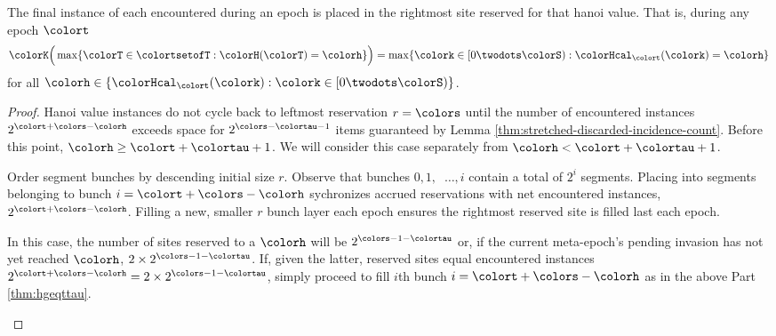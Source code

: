 \begin{lemma}
\label{thm:tilted-last-touched}
The final instance of each \hv{} encountered during an epoch is placed in the rightmost site reserved for that hanoi value.
That is, during any epoch $\colort$
\begin{align*}
\colorK\Big(
  \max\{\colorT \in \colortsetofT : \colorH(\colorT) = \colorh\}
\Big)
=
\max\{\colork \in [0\twodots\colorS) : \colorHcal_{\colort}(\colork) = \colorh \}
\end{align*}
for all $\colorh \in \{\colorHcal_{\colort}(\colork) : \colork \in [0\twodots\colorS)\}$.
\end{lemma}

\begin{proof}
Hanoi value instances do not cycle back to leftmost reservation $r=\colors$ until the number of encountered \hv{} instances $2^{\colort + \colors - \colorh}$ exceeds space for $2^{\colors - \colortau - 1}$ items guaranteed by Lemma \ref{thm:stretched-discarded-incidence-count}.
Before this point, $\colorh \geq \colort + \colortau + 1$.
We will consider this case separately from $\colorh < \colort + \colortau + 1$.

\begin{proofpart}
\label{thm:hgeqttau}
Order segment bunches by descending initial size $r$.
Observe that bunches $0,1,\;\;\ldots,i$ contain a total of $2^i$ segments.
Placing into segments belonging to bunch $i = \colort + \colors - \colorh$ sychronizes accrued reservations with net encountered \hv{} instances, $2^{\colort + \colors - \colorh}$.
Filling a new, smaller $r$ bunch layer each epoch ensures the rightmost reserved site is filled last each epoch.
\end{proofpart}

\begin{proofpart}
In this case, the number of sites reserved to a \hv{} $\colorh$ will be $2^{\colors - 1 - \colortau}$ or, if the current meta-epoch's pending invasion has not yet reached \hv{} $\colorh$, $2 \times 2^{\colors - 1 - \colortau}$.
If, given the latter, reserved sites equal encountered \hv{} instances $2^{\colort + \colors - \colorh} = 2 \times 2^{\colors - 1 - \colortau}$, simply proceed to fill $i$th bunch $i=\colort + \colors - \colorh$ as in the above Part \ref{thm:hgeqttau}.


\end{proofpart}
\end{proof}
